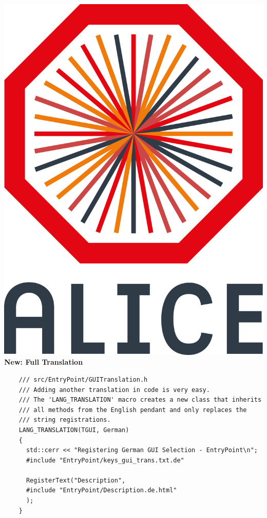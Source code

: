 \documentclass[aspectratio=169,14pt,dvipsnames]{beamer}
\begin{document}
\begin{frame}[fragile]{\includegraphics[height=0.07\textheight]{2012-Jul-04-4_Color_Logo_CB.png} \hspace{0.2cm}\textbf{New: Full Translation}}
  \begin{verbatim}
    /// src/EntryPoint/GUITranslation.h
    /// Adding another translation in code is very easy.
    /// The 'LANG_TRANSLATION' macro creates a new class that inherits
    /// all methods from the English pendant and only replaces the
    /// string registrations.
    LANG_TRANSLATION(TGUI, German)
    {
      std::cerr << "Registering German GUI Selection - EntryPoint\n";
      #include "EntryPoint/keys_gui_trans.txt.de"

      RegisterText("Description",
      #include "EntryPoint/Description.de.html"
      );
    }
  \end{verbatim}
\end{frame}
\end{document}
